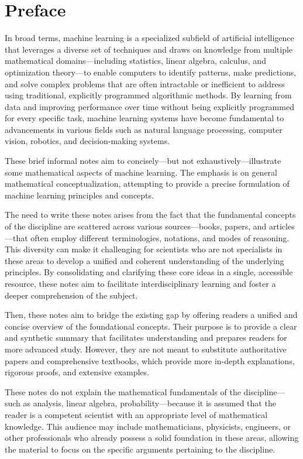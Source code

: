 \documentclass{report}
\begin{document}
\chapter*{Preface}
In broad terms, machine learning is a specialized subfield of artificial intelligence that leverages a diverse set of techniques and draws on knowledge from multiple mathematical domains—including statistics, linear algebra, calculus, and optimization theory—to enable computers to identify patterns, make predictions, and solve complex problems that are often intractable or inefficient to address using traditional, explicitly programmed algorithmic methods. By learning from data and improving performance over time without being explicitly programmed for every specific task, machine learning systems have become fundamental to advancements in various fields such as natural language processing, computer vision, robotics, and decision-making systems.

These brief informal notes aim to concisely—but not exhaustively—illustrate some mathematical aspects of machine learning. The emphasis is on general mathematical conceptualization, attempting to provide a precise formulation of machine learning principles and concepts.

The need to write these notes arises from the fact that the fundamental concepts of the discipline are scattered across various sources—books, papers, and articles—that often employ different terminologies, notations, and modes of reasoning. This diversity can make it challenging for scientists who are not specialists in these areas to develop a unified and coherent understanding of the underlying principles. By consolidating and clarifying these core ideas in a single, accessible resource, these notes aim to facilitate interdisciplinary learning and foster a deeper comprehension of the subject.

Then, these notes aim to bridge the existing gap by offering readers a unified and concise overview of the foundational concepts. Their purpose is to provide a clear and synthetic summary that facilitates understanding and prepares readers for more advanced study. However, they are not meant to substitute authoritative papers and comprehensive textbooks, which provide more in-depth explanations, rigorous proofs, and extensive examples.

These notes do not explain the mathematical fundamentals of the discipline—such as analysis, linear algebra, probability—because it is assumed that the reader is a competent scientist with an appropriate level of mathematical knowledge. This audience may include mathematicians, physicists, engineers, or other professionals who already possess a solid foundation in these areas, allowing the material to focus on the specific arguments pertaining to the discipline.
\end{document}
